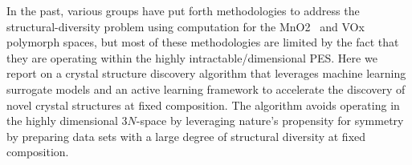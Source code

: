 In the past, various groups have put forth methodologies to address the structural-diversity problem using computation for the MnO2~\cite{} and VOx~\cite{} polymorph spaces,
but most of these methodologies are limited by the fact that they are operating within the highly intractable/dimensional PES.
Here we report on a crystal structure discovery algorithm that leverages machine learning surrogate models and an active learning framework to accelerate the discovery of novel crystal structures at fixed composition.
The algorithm avoids operating in the highly dimensional $3N$-space by leveraging nature's propensity for symmetry by preparing data sets with a large degree of structural diversity at fixed composition.

%





